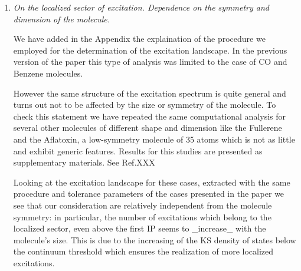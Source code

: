 \documentclass[11pt,a4paper]{article}
\begin{document}
\begin{enumerate}

 \item \emph{On the localized sector of excitation. Dependence on the symmetry and dimension of the molecule.}

 We have added in the Appendix the explaination
 of the procedure we employed for the determination of the excitation landscape.
  In the previous version of the paper this type of analysis was limited to the case of CO and Benzene molecules.

  However the same structure of the excitation spectrum is quite general and turns out not to be affected by the size or symmetry of the molecule. To check this statement we have repeated
 the same computational analysis for several other molecules of different shape and dimension like the Fullerene and the Aflatoxin, a low-symmetry molecule of 35 atoms which is not as little and exhibit generic features. Results for this studies
 are presented as supplementary materials. See Ref.XXX

 Looking at the excitation landscape for these cases, extracted with the same procedure and tolerance parameters of the cases presented in the paper we see that our consideration are relatively independent from the molecule symmetry: in particular, the number of excitations which
 belong to the localized sector, even above the first IP
 seems to _increase_ with the molecule's size.
 This is due to the increasing of the KS density of states below the continuum threshold which ensures the realization of more localized excitations.


\end{enumerate}
\end{document}
